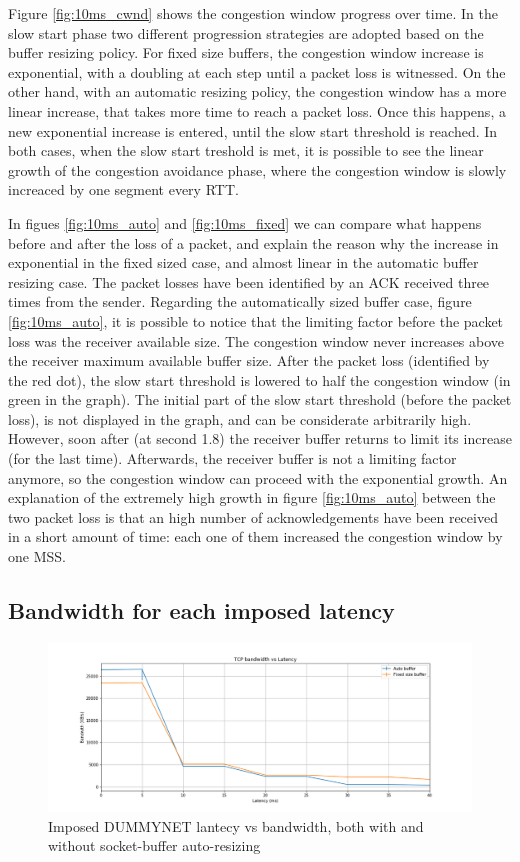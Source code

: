 \documentclass[a4paper,10pt]{article}
\begin{document}
Figure \ref{fig:10ms_cwnd} shows the congestion window progress over time. In the slow start phase two different progression strategies are adopted based on the buffer resizing policy. For fixed size buffers, the congestion window increase is exponential, with a doubling at each step until a packet loss is witnessed. On the other hand, with an automatic resizing policy, the congestion window has a more linear increase, that takes more time to reach a packet loss. Once this happens, a new exponential increase is entered, until the slow start threshold is reached.
In both cases, when the slow start treshold is met, it is possible to see the linear growth of the congestion avoidance phase, where the congestion window is slowly increaced by one segment every RTT.

In figues \ref{fig:10ms_auto} and \ref{fig:10ms_fixed} we can compare what happens before and after the loss of a packet, and explain the reason why the increase in exponential in the fixed sized case, and almost linear in the automatic buffer resizing case. 
The packet losses have been identified by an ACK received three times from the sender. 
Regarding the automatically sized buffer case, figure \ref{fig:10ms_auto}, it is possible to notice that the limiting factor before the packet loss was the receiver available size. The congestion window never increases above the receiver maximum available buffer size. After the packet loss (identified by the red dot), the slow start threshold is lowered to half the congestion window (in green in the graph). The initial part of the slow start threshold (before the packet loss), is not displayed in the graph, and can be considerate arbitrarily high. However, soon after (at second 1.8) the receiver buffer returns to limit its increase (for the last time). Afterwards, the receiver buffer is not a limiting factor anymore, so the congestion window can proceed with the exponential growth.
An explanation of the extremely high growth in figure \ref{fig:10ms_auto} between the two packet loss is that an high number of acknowledgements have been received in a short amount of time: each one of them increased the congestion window by one MSS.

\subsection{Bandwidth for each imposed latency}

\begin{figure}[h]
\centering
\includegraphics[width=\textwidth]{images/tcp_bandwidth.png}
  \caption{Imposed DUMMYNET lantecy vs bandwidth, both with and without socket-buffer auto-resizing}
   \label{fig:bandwidth}
\end{figure}
\end{document}
